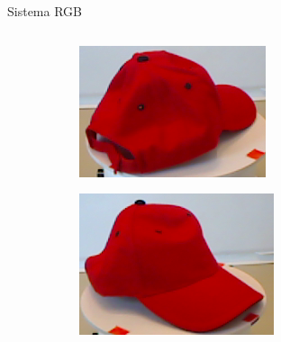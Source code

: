 \documentclass[]{beamer}
\begin{document}
\begin{frame}{Sistema RGB}
\begin{columns}
\begin{column}{5cm}
{\begin{figure}
                	\begin{subfigure}[b]{0.4\textwidth}
                		\includegraphics[width=\textwidth]{img/templates/180_crop.png}
                	\end{subfigure}
                	\quad
                	\begin{subfigure}[b]{0.4\textwidth}
                		\includegraphics[width=\textwidth]{img/templates/270_crop.png}
                	\end{subfigure}
                \end{figure}
            }
\end{column}
\end{columns}
\end{frame}
\end{document}

